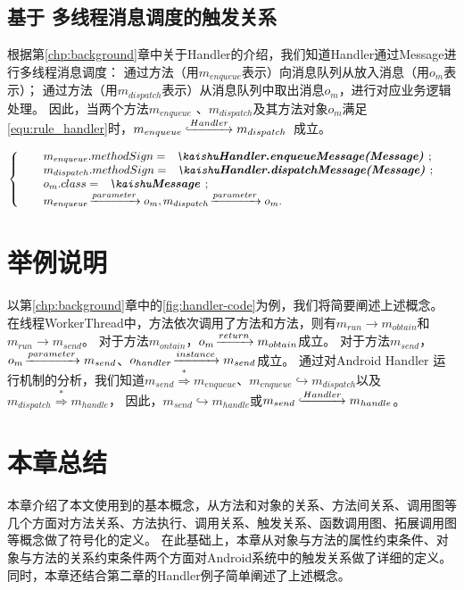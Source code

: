 \subsection{基于 多线程消息调度的触发关系}

根据第\ref{chp:background}章中关于Handler的介绍，我们知道Handler通过Message进行多线程消息调度：
通过方法（用$m_{enqueue}$表示）向消息队列从放入消息（用$o_m$表示）；
通过方法（用$m_{dispatch}$表示）从消息队列中取出消息$o_m$，进行对应业务逻辑处理。
因此，当两个方法$m_{enqueue}$ 、$m_{dispatch}$及其方法对象$o_{m}$满足\autoref{equ:rule_handler}时，$m_{enqueue} \lhook\joinrel\xrightarrow{Handler}  m_{dispatch}  $ 成立。

\begin{equation}
\left\{  
\begin{array}{ll}
&m_{enqueue}.methodSign = \text{\codeInEqu{Handler.enqueueMessage(Message)}};\\
&m_{dispatch}.methodSign = \text{\codeInEqu{Handler.dispatchMessage(Message)}};\\
& o_m.class =   \text{\codeInEqu{Message}}; \\
 &m_{enqueue}\joinrel\xrightarrow{parameter} o_m  , m_{dispatch}\joinrel\xrightarrow{parameter} o_m.
\end{array}  
\right.  
\label{equ:rule_handler} 
\end{equation}


\section{举例说明}



以第\ref{chp:background}章中的\autoref{fig:handler-code}为例，我们将简要阐述上述概念。
在线程WorkerThread中，方法依次调用了方法和方法，则有$m_{run} \to m_{obtain} $和$m_{run} \to m_{send}$。
对于方法$m_{ontain}$，$o_{m} \joinrel\xrightarrow{return} m_{obtain} $成立。
对于方法$m_{send}$，$o_{m} \joinrel\xrightarrow{parameter} m_{send} $、$o_{handler} \joinrel\xrightarrow{instance} m_{send} $成立。
通过对Android Handler 运行机制的分析，我们知道$m_{send} \stackrel{\ast	}{\Rightarrow} m_{enqueue} $、$m_{enqueue} \hookrightarrow m_{dispatch}$以及$m_{dispatch} \stackrel{\ast}{\Rightarrow}  m_{handle}$，
因此，$m_{send} \hookrightarrow m_{handle}$或$m_{send} \lhook\joinrel\xrightarrow{Handler}  m_{handle} $。


\section{本章总结}

本章介绍了本文使用到的基本概念，从方法和对象的关系、方法间关系、调用图等几个方面对方法关系、方法执行、调用关系、触发关系、函数调用图、拓展调用图等概念做了符号化的定义。
在此基础上，本章从对象与方法的属性约束条件、对象与方法的关系约束条件两个方面对Android系统中的触发关系做了详细的定义。
同时，本章还结合第二章的Handler例子简单阐述了上述概念。

